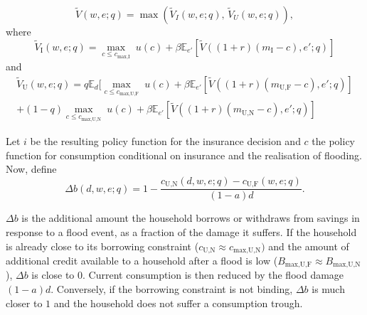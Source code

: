 \documentclass[12pt]{article}
\begin{document}
\begin{equation}
\tilde{V}(w,e;q)=\max\left(\tilde{V}_{I}(w,e;q),\,\tilde{V}_{U}(w,e;q)\right),
\end{equation}
where
\begin{equation}
\tilde{V}_{\text{I}}(w,e;q)=\max_{c\leq c_{\text{max,I}}}\; u(c)+\beta \mathbb{E}_{e'}[\tilde{V}((1+r)(m_\text{I}-c),e';q)]
\end{equation}
and
\begin{align}
\tilde{V}_{\text{U}}(w,e;q)= q\mathbb{E}_d[\max_{c\leq c_{\text{max,U,F}}}\; u(c)+\beta \mathbb{E}_{e'}[\tilde{V}((1+r)(m_\text{U,F}-c),e';q)]\\
+(1-q)\max_{c\leq c_{\text{max,U,N}}}\; u(c)+\beta \mathbb{E}_{e'}[\tilde{V}((1+r)(m_\text{U,N}-c),e';q)]
\end{align}



Let $i$ be the resulting policy function for the insurance decision and $c$ the policy function for consumption conditional on insurance and the realisation of flooding. Now, define 
\begin{equation}
\Delta b(d,w,e;q)=1-\frac{c_\text{U,N}(d,w,e;q)-c_\text{U,F}(w,e;q)}{(1-a)d}.
\end{equation}

$\Delta b$ is the additional amount the household borrows or withdraws from savings in response to a flood event, as a fraction of the damage it suffers. If the household is already close to its borrowing constraint ($c_\text{U,N}\approx c_\text{max,U,N})$ and the amount of additional credit available to a household after a flood is low ($B_\text{max,U,F}\approx B_\text{max,U,N}$), $\Delta b$ is close to $0$. Current consumption is then reduced by the flood damage $(1-a)d$. Conversely, if the borrowing constraint is not binding, $\Delta b$ is much closer to $1$ and the household does not suffer a consumption trough.      
\end{document}
